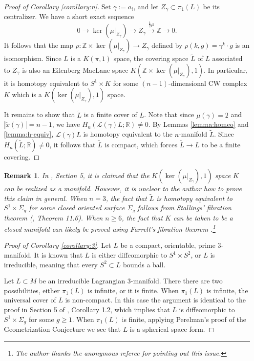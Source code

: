 \documentclass[a4paper]{article}
\newtheorem{remark}[theorem]{Remark}
\numberwithin{equation}{section}
\begin{document}
\begin{proof}[Proof of Corollary \ref{corollary:n}]
Set $\gamma:=a_i$, and let $Z_\gamma\subset\pi_1(L)$ be its centralizer. We have a short exact sequence
\begin{equation}
0\rightarrow\ker(\mu|_{Z_\gamma})\rightarrow Z_\gamma\xrightarrow{\frac{1}{2}\mu}\mathbb{Z}\rightarrow0.
\end{equation}
It follows that the map $\rho:\mathbb{Z}\times\ker(\mu|_{Z_\gamma})\rightarrow Z_\gamma$ defined by $\rho(k,g)=\gamma^k\cdot g$ is an isomorphism. Since $L$ is a $K(\pi,1)$ space, the covering space $\widetilde{L}$ of $L$ associated to $Z_\gamma$ is also an Eilenberg-MacLane space $K\left(\mathbb{Z}\times\ker(\mu|_{Z_\gamma}),1\right)$. In particular, it is homotopy equivalent to $S^1\times K$ for some $(n-1)$-dimensional CW complex $K$ which is a $K\left(\ker(\mu|_{Z_\gamma}),1\right)$ space. 

It remains to show that $\widetilde{L}$ is a finite cover of $L$. Note that since $\mu(\gamma)=2$ and $|\tilde{x}(\gamma)|=n-1$, we have $H_n(\mathcal{L}(\gamma)L;\mathbb{R})\neq0$. By Lemmas \ref{lemma:homeo} and \ref{lemma:h-equiv}, $\mathcal{L}(\gamma)L$ is homotopy equivalent to the $n$-manifold $\widetilde{L}$. Since $H_n(\widetilde{L};\mathbb{R})\neq0$, it follows that $\widetilde{L}$ is compact, which forces $\widetilde{L}\rightarrow L$ to be a finite covering.
\end{proof}

\begin{remark}\label{remark:manifold}
In \cite{jlf}, Section 5, it is claimed that the $K\left(\ker(\mu|_{Z_\gamma}),1\right)$ space $K$ can be realized as a manifold. However, it is unclear to the author how to prove this claim in general. When $n=3$, the fact that $\widetilde{L}$ is homotopy equivalent to $S^1\times\Sigma_g$ for some closed oriented surface $\Sigma_g$ follows from Stallings' fibration theorem (\cite{jh3}, Theorem 11.6). When $n\geq6$, the fact that $K$ can be taken to be a closed manifold can likely be proved using Farrell's fibration theorem \cite{tft}.\footnote{The author thanks the anonymous referee for pointing out this issue.}
\end{remark}

\begin{proof}[Proof of Corollary \ref{corollary:3}]
Let $L$ be a compact, orientable, prime $3$-manifold. It is known that $L$ is either diffeomorphic to $S^1\times S^2$, or $L$ is irreducible, meaning that every $S^2\subset L$ bounds a ball.

Let $L\subset M$ be an irreducible Lagrangian $3$-manifold. There there are two possibilities, either $\pi_1(L)$ is infinite, or it is finite. When $\pi_1(L)$ is infinite, the universal cover of $L$ is non-compact. In this case the argument is identical to the proof in Section 5 of \cite{jlf}, Corollary 1.2, which implies that $L$ is diffeomorphic to $S^1\times\Sigma_g$ for some $g\geq1$. When $\pi_1(L)$ is finite, applying Perelman's proof of the Geometrization Conjecture we see that $L$ is a spherical space form. 
\end{proof}
\end{document}
